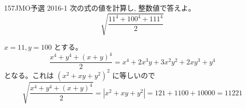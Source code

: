 \begin{thm}{157}{}{JMO予選 2016-1}
 次の式の値を計算し, 整数値で答えよ。\\
 \[ \sqrt{\dfrac{11^4+100^4+111^4}{2}} \]
\end{thm}

$x=11, y=100$ とする。
\[\dfrac{x^4+y^4+(x+y)^4}{2}=x^4+2x^3y+3x^2y^2+2xy^3+y^4\]
となる。これは $(x^2+xy+y^2)^2$ に等しいので
\[\sqrt{\dfrac{x^4+y^4+(x+y)^4}{2}}=|x^2+xy+y^2|=121+1100+10000=11221\]
